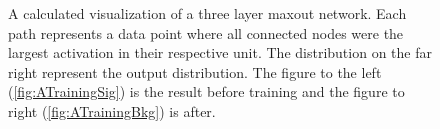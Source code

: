 \begin{figure}
{\begin{subfigure}{.6\textwidth}
        \caption{}
        \label{fig:ATraining}
    \end{subfigure}
    }
    \caption[A calculated visualization of the activation of a three layer maxout network, before and after training.]{
    A calculated visualization of a three layer maxout network. Each path 
    represents a data point where all connected nodes were the largest activation in their respective 
    unit. The distribution on the far right represent the output distribution. The figure to the left
    (\ref{fig:ATrainingSig}) is the result before training and the figure to right (\ref{fig:ATrainingBkg})
    is after.}
\end{figure}
\begin{figure}
\end{figure}
